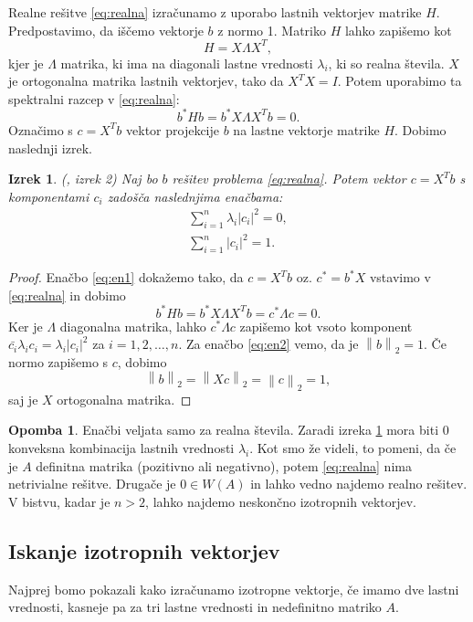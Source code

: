 \documentclass[12pt,a4paper]{amsart}
\theoremstyle{definition}
\newtheorem{opomba}[definicija]{Opomba}
\theoremstyle{plain}
\newtheorem{izrek}[definicija]{Izrek}
\newcommand{\abs}[1]{ \left\lvert#1\right\rvert}
\newcommand{\norm}[1]{\left\lVert#1\right\rVert}
\begin{document}
Realne rešitve \eqref{eq:realna} izračunamo z uporabo lastnih vektorjev matrike $H$. Predpostavimo, da iščemo vektorje $b$ z normo 1. Matriko $H$ lahko zapišemo kot $$H=X\Lambda X^T,$$ kjer je $\Lambda$ matrika, ki ima na diagonali lastne vrednosti $\lambda_i$, ki so realna števila. $X$ je ortogonalna matrika lastnih vektorjev, tako da $X^T X=I$. Potem uporabimo ta spektralni razcep v \eqref{eq:realna}: $$b^\ast Hb=b^\ast X\Lambda X^T b=0.$$ Označimo s $c=X^Tb$ vektor projekcije $b$ na lastne vektorje matrike $H$. Dobimo naslednji izrek.
\begin{izrek} \label{izrek2}(\cite{meurant}, izrek 2)
Naj bo $b$ rešitev problema \eqref{eq:realna}. Potem vektor $c=X^T b$ s komponentami $c_i$ zadošča naslednjima enačbama:
\begin{align}
\sum_{i=1}^{n} \lambda_i \abs{c_i}^2=0 \label{eq:en1},\\
\sum_{i=1}^{n}\abs{c_i}^2=1. \label{eq:en2}
\end{align}
\end{izrek}
\begin{proof}
Enačbo \eqref{eq:en1}  dokažemo tako, da $c=X^Tb$ oz. $c^\ast =b^\ast X$ vstavimo v \eqref{eq:realna} in dobimo $$b^\ast Hb=b^\ast X\Lambda X^T b= c^\ast \Lambda c=0.$$ Ker je $\Lambda$ diagonalna matrika, lahko $c^\ast \Lambda c$ zapišemo kot vsoto komponent $\bar{c_i}\lambda_i c_i=\lambda_i\abs{c_i}^2$ za $i=1,2, \dots ,n$.
Za enačbo \eqref{eq:en2} vemo, da je $\norm{b}_2=1$. Če normo zapišemo s $c$, dobimo $$\norm{b}_2=\norm{Xc}_2=\norm{c}_2=1,$$ saj je $X$ ortogonalna matrika.

\end{proof}
\begin{opomba}
Enačbi veljata samo za realna števila. Zaradi  izreka \ref{izrek2} mora biti 0 konveksna kombinacija lastnih vrednosti $\lambda_i$. Kot smo že videli, to pomeni, da če je $A$ definitna matrika (pozitivno ali negativno), potem \eqref{eq:realna}
nima netrivialne rešitve. Drugače je $0 \in W(A)$ in lahko vedno najdemo realno rešitev. V bistvu, kadar je $n>2$, lahko najdemo neskončno izotropnih vektorjev.
\end{opomba}
\subsection{Iskanje izotropnih vektorjev}
Najprej bomo pokazali kako izračunamo i\-zo\-trop\-ne vektorje, če imamo dve lastni vrednosti, kasneje pa za tri lastne vrednosti in nedefinitno matriko $A$.\\
\end{document}

